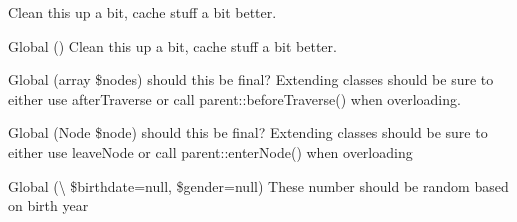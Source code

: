 \begin{DoxyRefList}
Clean this up a bit, cache stuff a bit better.  
\item[Global \doxylink{interface_whoops_1_1_inspector_1_1_inspector_interface_acf0fa98548c6a73a611c1955b3f9fd94}{Inspector\+Interface\+::get\+Previous\+Exception\+Inspector} ()]\label{todo__todo000007}%
%
Clean this up a bit, cache stuff a bit better.  
\item[Global \doxylink{class_psy_1_1_code_cleaner_1_1_namespace_aware_pass_a61cf9be18190b38cbe8e0778f4cb2fd8}{Namespace\+Aware\+Pass\+::before\+Traverse} (array \$nodes)]\label{todo__todo000011}%
%
should this be final? Extending classes should be sure to either use after\+Traverse or call parent\+::before\+Traverse() when overloading. 
\item[Global \doxylink{class_psy_1_1_code_cleaner_1_1_namespace_aware_pass_a72d9ab2b97095f3bf1c97eb453a386d1}{Namespace\+Aware\+Pass\+::enter\+Node} (Node \$node)]\label{todo__todo000012}%
%
should this be final? Extending classes should be sure to either use leave\+Node or call parent\+::enter\+Node() when overloading 
\item[Global \doxylink{class_faker_1_1_provider_1_1nb___n_o_1_1_person_a30dd304b5e65242e0c01023eeb53fc19}{Person\+::personal\+Identity\+Number} (\textbackslash{}\doxylink{class_faker_1_1_provider_1_1_date_time}{Date\+Time} \$birthdate=null, \$gender=null)]\label{todo__todo000003}%
%
These number should be random based on birth year


\end{DoxyRefList}
